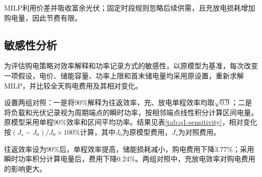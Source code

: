 MILP利用价差并吸收富余光伏；固定时段规则忽略后续供需，且充放电损耗增加购电量，因此节费有限。

\subsection{敏感性分析}

为评估购电策略对效率解释和功率记录方式的敏感性，以原模型为基准，每次改变一项假设，电价、储能容量、功率上限和首末储电量均采用原设置，重新求解MILP，并比较全天购电费用及其相对变化。

设置两组对照：一是将90\%解释为往返效率，充、放电单程效率均取$\sqrt{0.9}$；二是将负载和光伏记录视为周期端点的瞬时功率，按相邻端点线性积分计算区间电量。原模型采用单程90\%效率和区间平均功率。结果见表\ref{tab:q1-sensitivity}，相对变化按$(J_s-J_0)/J_0\times100\%$计算，其中$J_0$为原模型费用，$J_s$为对照费用。

\begin{table}[H]
    \centering\small
    \caption{不同效率与功率记录假设下的购电费用及相对变化}
    \label{tab:q1-sensitivity}
    \renewcommand{\arraystretch}{1.18}
    
\end{table}

往返效率设为90\%后，单程效率提高，储能损耗减小，购电费用下降3.77\%；采用瞬时功率积分计算电量后，费用下降0.24\%。两组对照中，充放电效率对购电费用的影响更大。
